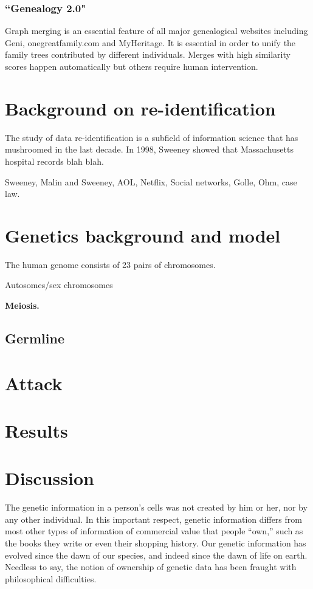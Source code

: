 \documentclass{article}
\begin{document}
\subsubsection{``Genealogy 2.0"}

Graph merging is  an essential feature of all major genealogical websites including Geni\cite{geni-merge}, onegreatfamily.com\cite{onegreatfamily-merge} and MyHeritage\cite{myheritage-merge}.  It is essential in order to unify the family trees contributed by different individuals.  Merges with high similarity scores happen automatically but others require human intervention.




\section{Background on re-identification}
The study of data re-identification is a subfield of information science that has mushroomed in the last decade. In 1998, Sweeney \cite{sweeney} showed that Massachusetts hospital records blah blah. 

 Sweeney, Malin and Sweeney, AOL, Netflix, Social networks, Golle, Ohm, case law.

\section{Genetics background and model}
The human genome consists of 23 pairs of chromosomes. 

Autosomes/sex chromosomes

{\bf Meiosis.}

\subsection{Germline}

\section{Attack}

\section{Results}

\section{Discussion}
The genetic information in a person's cells was not created by him or her, nor by any other individual. In this important respect, genetic information differs from most other types of information of commercial value that people ``own,'' such as the books they write or even their shopping history. Our genetic information has evolved since the dawn of our species, and indeed since the dawn of life on earth. Needless to say, the notion of ownership of genetic data has been fraught with philosophical difficulties.
\end{document}
